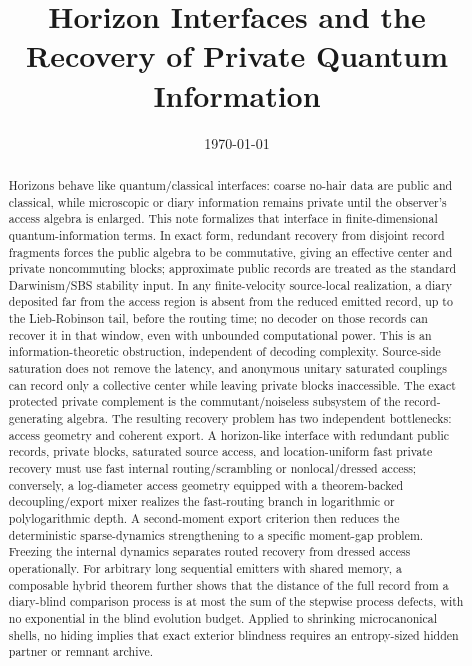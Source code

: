 \documentclass[11pt]{article}
\title{Horizon Interfaces and the Recovery of Private Quantum Information}
\author{}
\date{\today}
\begin{document}
\maketitle

\begin{abstract}
Horizons behave like quantum/classical interfaces: coarse no-hair data
are public and classical, while microscopic or diary information remains
private until the observer's access algebra is enlarged.  This note
formalizes that interface in finite-dimensional quantum-information
terms.  In exact form, redundant recovery from disjoint record fragments
forces the public algebra to be commutative, giving an effective center
and private noncommuting blocks; approximate public records are treated
as the standard Darwinism/SBS stability input.  In any finite-velocity
source-local realization, a diary deposited far from the access region is
absent from the reduced emitted record, up to the Lieb-Robinson tail,
before the routing time; no decoder on those records can recover it in
that window, even with unbounded computational power.  This is an
information-theoretic obstruction, independent of decoding complexity.
Source-side
saturation does not remove the latency, and anonymous unitary saturated
couplings can record only a collective center while leaving private
blocks inaccessible.  The exact protected private complement is the
commutant/noiseless subsystem of the record-generating algebra.
The resulting recovery problem has two independent bottlenecks: access
geometry and coherent export.  A horizon-like interface with redundant
public records, private blocks, saturated source access, and
location-uniform fast private recovery must use fast internal
routing/scrambling or nonlocal/dressed access; conversely, a
log-diameter access geometry equipped with a theorem-backed
decoupling/export mixer realizes the fast-routing branch in
logarithmic or polylogarithmic depth.  A second-moment export criterion
then reduces the deterministic sparse-dynamics strengthening to a
specific moment-gap problem.  Freezing the internal dynamics separates
routed recovery from dressed access operationally.
For arbitrary long sequential emitters with shared memory, a composable
hybrid theorem further shows that the distance of the full record from a
diary-blind comparison process is at most the sum of the stepwise process
defects, with no exponential in the blind evolution budget.  Applied to
shrinking microcanonical shells, no hiding implies that exact exterior
blindness requires an entropy-sized hidden partner or remnant archive.
\end{abstract}
\end{document}
